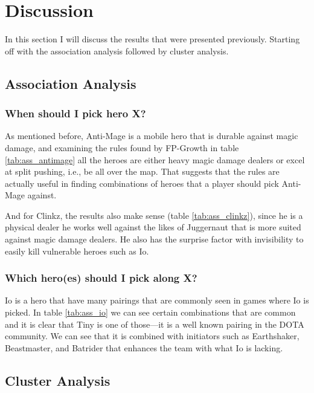 \documentclass[result.tex]{subfiles}
\begin{document}
\section*{\centering Discussion}

In this section I will discuss the results that were presented previously. Starting off with the association analysis followed by cluster analysis.

\subsection*{Association Analysis}

\subsubsection*{When should I pick hero X?}

As mentioned before, Anti-Mage is a mobile hero that is durable against magic damage, and examining the rules found by FP-Growth in table \ref{tab:ass_antimage} all the heroes are either heavy magic damage dealers or excel at split pushing, i.e., be all over the map. That suggests that the rules are actually useful in finding combinations of heroes that a player should pick Anti-Mage against.

And for Clinkz, the results also make sense (table \ref{tab:ass_clinkz}), since he is a physical dealer he works well against the likes of Juggernaut that is more suited against magic damage dealers. He also has the surprise factor with invisibility to easily kill vulnerable heroes such as Io.

\subsubsection*{Which hero(es) should I pick along X?}

Io is a hero that have many pairings that are commonly seen in games where Io is picked. In table \ref{tab:ass_io} we can see certain combinations that are common and it is clear that Tiny is one of those---it is a well known pairing in the DOTA community. We can see that it is combined with initiators such as Earthshaker, Beastmaster, and Batrider that enhances the team with what Io is lacking.

\subsection*{Cluster Analysis}
\end{document}
